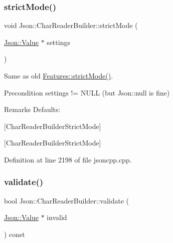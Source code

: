 \subsubsection{\texorpdfstring{strict\+Mode()}{strictMode()}\hspace{0.1cm}{\footnotesize\ttfamily [2/2]}}
{\footnotesize\ttfamily void Json\+::\+Char\+Reader\+Builder\+::strict\+Mode (\begin{DoxyParamCaption}\item[{\hyperlink{class_json_1_1_value}{Json\+::\+Value} $\ast$}]{settings }\end{DoxyParamCaption})\hspace{0.3cm}{\ttfamily [static]}}

Same as old \hyperlink{class_json_1_1_features_ae23176c14b2e79e81fb61fb1a8ab58ee}{Features\+::strict\+Mode()}. \begin{DoxyPrecond}{Precondition}
\textquotesingle{}settings\textquotesingle{} != N\+U\+LL (but Json\+::null is fine) 
\end{DoxyPrecond}
\begin{DoxyRemark}{Remarks}
Defaults\+: 
\begin{DoxyCodeInclude}
\end{DoxyCodeInclude}

\end{DoxyRemark}
\mbox{[}Char\+Reader\+Builder\+Strict\+Mode\mbox{]}

\mbox{[}Char\+Reader\+Builder\+Strict\+Mode\mbox{]} 

Definition at line 2198 of file jsoncpp.\+cpp.

\hypertarget{class_json_1_1_char_reader_builder_af890b5cb70e9b372e41de5c9e6535d21}{}\label{class_json_1_1_char_reader_builder_af890b5cb70e9b372e41de5c9e6535d21} 
\subsubsection{\texorpdfstring{validate()}{validate()}\hspace{0.1cm}{\footnotesize\ttfamily [1/2]}}
{\footnotesize\ttfamily bool Json\+::\+Char\+Reader\+Builder\+::validate (\begin{DoxyParamCaption}\item[{\hyperlink{class_json_1_1_value}{Json\+::\+Value} $\ast$}]{invalid }\end{DoxyParamCaption}) const}

